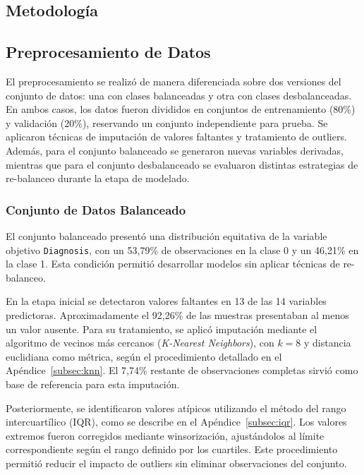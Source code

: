 \begin{multicols}{2}
\section{Metodología}
\subsection{Preprocesamiento de Datos}

El preprocesamiento se realizó de manera diferenciada sobre dos versiones del conjunto de datos: una con clases balanceadas y otra con clases desbalanceadas. En ambos casos, los datos fueron divididos en conjuntos de entrenamiento (80\%) y validación (20\%), reservando un conjunto independiente para prueba. Se aplicaron técnicas de imputación de valores faltantes y tratamiento de outliers. Además, para el conjunto balanceado se generaron nuevas variables derivadas, mientras que para el conjunto desbalanceado se evaluaron distintas estrategias de re-balanceo durante la etapa de modelado.

\subsubsection{Conjunto de Datos Balanceado}
\label{subsec:preproc-balanced}

El conjunto balanceado presentó una distribución equitativa de la variable objetivo \texttt{Diagnosis}, con un 53{,}79\% de observaciones en la clase 0 y un 46{,}21\% en la clase 1. Esta condición permitió desarrollar modelos sin aplicar técnicas de re-balanceo.

En la etapa inicial se detectaron valores faltantes en 13 de las 14 variables predictoras. Aproximadamente el 92,26\% de las muestras presentaban al menos un valor ausente. Para su tratamiento, se aplicó imputación mediante el algoritmo de vecinos más cercanos (\textit{K-Nearest Neighbors}), con \(k = 8\) y distancia euclidiana como métrica, según el procedimiento detallado en el Apéndice~\ref{subsec:knn}. El 7,74\% restante de observaciones completas sirvió como base de referencia para esta imputación.

Posteriormente, se identificaron valores atípicos utilizando el método del rango intercuartílico (IQR), como se describe en el Apéndice~\ref{subsec:iqr}. Los valores extremos fueron corregidos mediante winsorización, ajustándolos al límite correspondiente según el rango definido por los cuartiles. Este procedimiento permitió reducir el impacto de outliers sin eliminar observaciones del conjunto.



\end{multicols}
